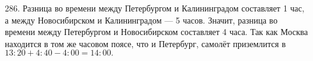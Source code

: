 286. Разница во времени между Петербургом и Калининградом составляет 1 час, а между Новосибирском и Калининградом --- 5 часов. Значит, разница во времени между Петербургом и Новосибирском составляет 4 часа. Так как Москва находится в том же часовом поясе, что и Петербург, самолёт приземлится в $13:20+4:40-4:00=14:00.$\\
